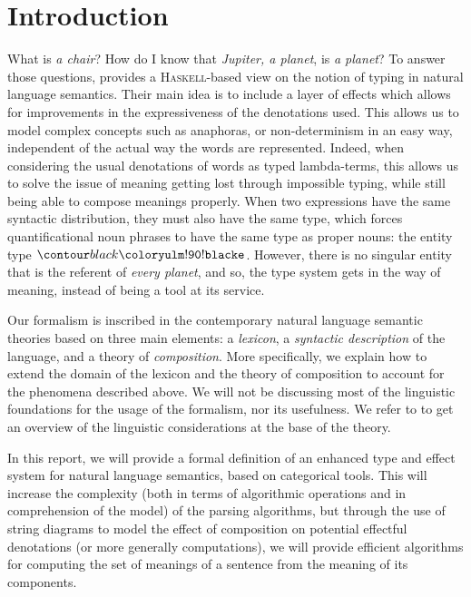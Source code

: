 \section*{Introduction}
What is \emph{a chair}? How do I know that \emph{Jupiter, a planet}, is
\emph{a planet}?
To answer those questions, \cite{bumfordEffectdrivenInterpretationFunctors2025}
provides a \textsc{Haskell}-based view on the notion of typing in natural
language semantics.
Their main idea is to include a layer of effects which allows for improvements
in the expressiveness of the denotations used.
This allows us to model complex concepts such as anaphoras, or non-determinism
in an easy way, independent of the actual way the words are represented.
Indeed, when considering the usual denotations of words as typed lambda-terms,
this allows us to solve the issue of meaning getting lost through impossible
typing, while still being able to compose meanings properly.
When two expressions have the same syntactic distribution, they must also have
the same type, which forces quantificational noun phrases to have the same type
as proper nouns: the entity type $\e$.
However, there is no singular entity that is the referent of \emph{every
	planet}, and so, the type system gets in the way of meaning, instead of being
a tool at its service.

\smallskip

Our formalism is inscribed in the contemporary natural language semantic
theories based on three main elements: a \emph{lexicon}, a
\emph{syntactic description} of the language, and a theory of
\emph{composition}.
More specifically, we explain how to extend the domain of the lexicon and the
theory of composition to account for the phenomena described above.
We will not be discussing most of the linguistic foundations for the usage of
the formalism, nor its usefulness.
We refer to \cite{bumfordEffectdrivenInterpretationFunctors2025} to get an
overview of the linguistic considerations at the base of the theory.

\smallskip

In this report, we will provide a formal definition of an enhanced type and
effect system for natural language semantics, based on categorical tools.
This will increase the complexity (both in terms of algorithmic operations and
in comprehension of the model) of the parsing algorithms, but through the use
of string diagrams to model the effect of composition on potential effectful
denotations (or more generally computations), we will provide efficient
algorithms for computing the set of meanings of a sentence from the meaning of
its components.

